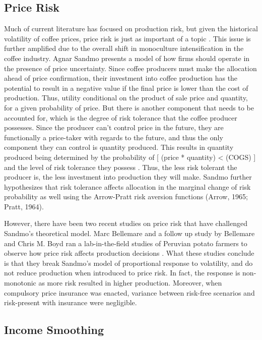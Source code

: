 \documentclass[../main.tex]{subfiles}
\begin{document}
\subsection{Price Risk}

Much of current literature has focused on production risk, but given the historical volatility of coffee prices, price risk is just as important of a topic \parencite{bacon_confronting_2005}. This issue is further amplified due to the overall shift in monoculture intensification in the coffee industry. Agnar Sandmo presents a model of how firms should operate in the presence of price uncertainty. Since coffee producers must make the allocation ahead of price confirmation, their investment into coffee production has the potential to result in a negative value if the final price is lower than the cost of production. Thus, utility conditional on the product of sale price and quantity, for a given probability of price. But there is another component that needs to be accounted for, which is the degree of risk tolerance that the coffee producer possesses. Since the producer can’t control price in the future, they are functionally a price-taker with regards to the future, and thus the only component they can control is quantity produced. This results in quantity produced being determined by the probability of [ (price * quantity) < (COGS) ] and the level of risk tolerance they possess \parencite{sandmo_theory_1971}. Thus, the less risk tolerant the producer is, the less investment into production they will make. Sandmo further hypothesizes that risk tolerance affects allocation in the marginal change of risk probability as well using the Arrow-Pratt risk aversion functions (Arrow, 1965; Pratt, 1964). 

However, there have been two recent studies on price risk that have challenged Sandmo’s theoretical model.  Marc Bellemare and a follow up study by Bellemare and Chris M. Boyd ran a lab-in-the-field studies of Peruvian potato farmers to observe how price risk affects production decisions \parencite{bellemare_producer_2020, boyd_why_2022}. What these studies conclude is that they break Sandmo’s model of proportional response to volatility, and do not reduce production when introduced to price risk. In fact, the response is non-monotonic as more risk resulted in higher production. Moreover, when compulsory price insurance was enacted, variance between risk-free scenarios and risk-present with insurance were negligible. 

\subsection{Income Smoothing}
\end{document}
